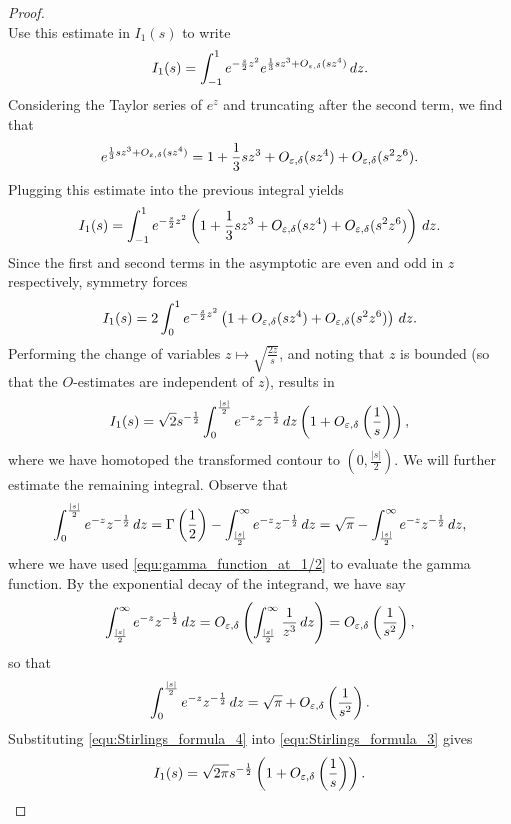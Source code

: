\documentclass[12pt]{article}
\begin{document}
\begin{proof}
\[      \]
      Use this estimate in \(I_{1}(s)\) to write
      \[
        I_{1}(s) = \int_{-1}^{1}e^{-\frac{s}{2}z^{2}}e^{\frac{1}{3}sz^{3}+O_{\varepsilon,\delta}(sz^{4})}\,dz.
      \]
       Considering the Taylor series of \(e^{z}\) and truncating after the second term, we find that
      \[
        e^{\frac{1}{3}sz^{3}+O_{\varepsilon,\delta}(sz^{4})} = 1+\frac{1}{3}sz^{3}+O_{\varepsilon,\delta}(sz^{4})+O_{\varepsilon,\delta}(s^{2}z^{6}).
      \]
      Plugging this estimate into the previous integral yields
      \[
        I_{1}(s) = \int_{-1}^{1}e^{-\frac{s}{2}z^{2}}\left(1+\frac{1}{3}sz^{3}+O_{\varepsilon,\delta}(sz^{4})+O_{\varepsilon,\delta}(s^{2}z^{6})\right)\,dz.
      \]
      Since the first and second terms in the asymptotic are even and odd in \(z\) respectively, symmetry forces
      \[
        I_{1}(s) = 2\int_{0}^{1}e^{-\frac{s}{2}z^{2}}\left(1+O_{\varepsilon,\delta}(sz^{4})+O_{\varepsilon,\delta}(s^{2}z^{6})\right)\,dz.
      \]
      Performing the change of variables \(z \mapsto \sqrt{\frac{2z}{s}}\), and noting that \(z\) is bounded (so that the \(O\)-estimates are independent of \(z\)), results in
      \begin{equation}\label{equ:Stirlings_formula_3}
        I_{1}(s) = \sqrt{2}s^{-\frac{1}{2}}\int_{0}^{\frac{|s|}{2}}e^{-z}z^{-\frac{1}{2}}\,dz\left(1+O_{\varepsilon,\delta}\left(\frac{1}{s}\right)\right),
      \end{equation}
      where we have homotoped the transformed contour to \(\left(0,\frac{|s|}{2}\right)\). We will further estimate the remaining integral. Observe that
      \[
        \int_{0}^{\frac{|s|}{2}}e^{-z}z^{-\frac{1}{2}}\,dz = \Gamma\left(\frac{1}{2}\right)-\int_{\frac{|s|}{2}}^{\infty}e^{-z}z^{-\frac{1}{2}}\,dz = \sqrt{\pi}-\int_{\frac{|s|}{2}}^{\infty}e^{-z}z^{-\frac{1}{2}}\,dz,
      \]
      where we have used \cref{equ:gamma_function_at_1/2} to evaluate the gamma function. By the exponential decay of the integrand, we have say
      \[
        \int_{\frac{|s|}{2}}^{\infty}e^{-z}z^{-\frac{1}{2}}\,dz = O_{\varepsilon,\delta}\left(\int_{\frac{|s|}{2}}^{\infty}\frac{1}{z^{3}}\,dz\right) = O_{\varepsilon,\delta}\left(\frac{1}{s^{2}}\right),
      \]
      so that 
      \begin{equation}\label{equ:Stirlings_formula_4}
        \int_{0}^{\frac{|s|}{2}}e^{-z}z^{-\frac{1}{2}}\,dz = \sqrt{\pi}+O_{\varepsilon,\delta}\left(\frac{1}{s^{2}}\right).
      \end{equation}
      Substituting \cref{equ:Stirlings_formula_4} into \cref{equ:Stirlings_formula_3} gives
      \begin{equation}\label{equ:Stirlings_formula_5}
        I_{1}(s) = \sqrt{2\pi}s^{-\frac{1}{2}}\left(1+O_{\e,\d}\left(\frac{1}{s}\right)\right).

\end{equation}
\end{proof}
\end{document}
